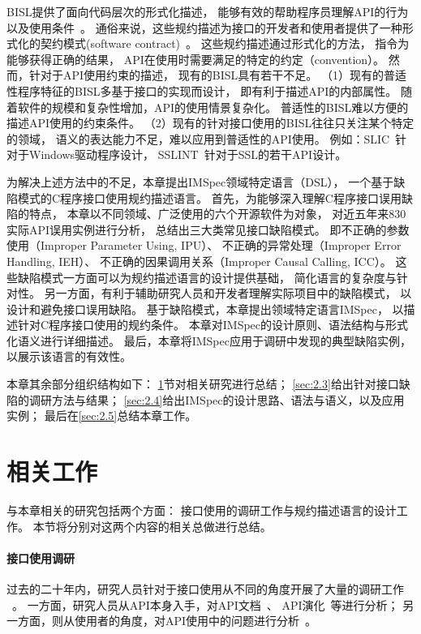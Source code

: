 BISL提供了面向代码层次的形式化描述，
能够有效的帮助程序员理解API的行为以及使用条件~\cite{survey12}。
通俗来说，这些规约描述为接口的开发者和使用者提供了一种形式化的契约模式(software contract)~\cite{92-ieee-contract}。
这些规约描述通过形式化的方法，
指令为能够获得正确的结果，
API在使用时需要满足的特定的约定（convention）。
然而，针对于API使用约束的描述，
现有的BISL具有若干不足。
（1）现有的普适性程序特征的BISL多基于接口的实现而设计，
即有利于描述API的内部属性。
随着软件的规模和复杂性增加，API的使用情景复杂化。
普适性的BISL难以方便的描述API使用的约束条件。
（2）现有的针对接口使用的BISL往往只关注某个特定的领域，
语义的表达能力不足，难以应用到普适性的API使用。
例如：SLIC~\cite{01-slic}针对于Windows驱动程序设计，
SSLINT~\cite{15-sp-sslint}针对于SSL的若干API设计。


为解决上述方法中的不足，本章提出IMSpec领域特定语言（DSL），
一个基于缺陷模式的C程序接口使用规约描述语言。
首先，为能够深入理解C程序接口误用缺陷的特点，
本章以不同领域、广泛使用的六个开源软件为对象，
对近五年来830实际API误用实例进行分析，
总结出三大类常见接口缺陷模式。
即不正确的参数使用（Improper Parameter Using, IPU）、
不正确的异常处理（Improper Error Handling, IEH）、
不正确的因果调用关系（Improper Causal Calling, ICC）。
这些缺陷模式一方面可以为规约描述语言的设计提供基础，
简化语言的复杂度与针对性。
另一方面，有利于辅助研究人员和开发者理解实际项目中的缺陷模式，
以设计和避免接口误用缺陷。
基于缺陷模式，本章提出领域特定语言IMSpec，
以描述针对C程序接口使用的规约条件。
本章对IMSpec的设计原则、语法结构与形式化语义进行详细描述。
最后，本章将IMSpec应用于调研中发现的典型缺陷实例，
以展示该语言的有效性。


本章其余部分组织结构如下：
\ref{sec:2.2}节对相关研究进行总结；
\ref{sec:2.3}给出针对接口缺陷的调研方法与结果；
\ref{sec:2.4}给出IMSpec的设计思路、语法与语义，以及应用实例；
最后在\ref{sec:2.5}总结本章工作。

\section{相关工作}
\label{sec:2.2}
与本章相关的研究包括两个方面：
接口使用的调研工作与规约描述语言的设计工作。
本节将分别对这两个内容的相关总做进行总结。

\paragraph{接口使用调研}
过去的二十年内，研究人员针对于接口使用从不同的角度开展了大量的调研工作
~\cite{16-icse-cry,17-tse-survey, 12-fse-parallel,12-fse-deprecation,
	18-sqj-evolution,11-etaps-doc, 15-ese-evolution, 11-ese-learning, 15-tse-change,13-etaps-mapping}。
一方面，研究人员从API本身入手，对API文档~\cite{12-fse-deprecation, 18-sqj-evolution,11-etaps-doc}、
API演化~\cite{15-ese-evolution,15-tse-change}等进行分析；
另一方面，则从使用者的角度，对API使用中的问题进行分析~\cite{16-icse-cry,17-tse-survey,12-fse-parallel,11-ese-learning,13-etaps-mapping}。

